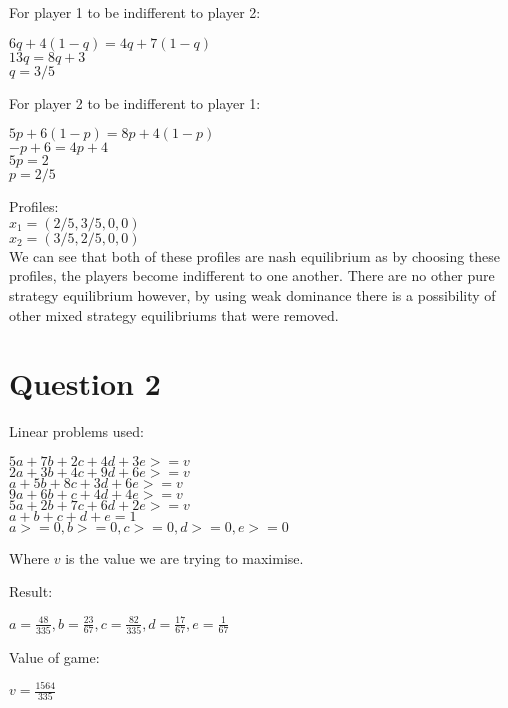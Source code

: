 \documentclass[11pt]{article}
\begin{document}
For player 1 to be indifferent to player 2:
\begin{center}
$6q + 4(1 - q) = 4q + 7(1 - q)$ \\
$13q = 8q + 3$\\
$q = 3/5$\\
\end{center}

For player 2 to be indifferent to player 1:
\begin{center}
$5p + 6(1 - p) = 8p + 4(1 - p)$\\
$-p + 6 = 4p + 4$\\
$5p = 2$\\
$p = 2 / 5$
\end{center}

Profiles:\\
	$x_{1} = (2/5, 3/5, 0, 0)$ \\
	$x_{2} = (3/5, 2/5, 0, 0)$ \\
	
We can see that both of these profiles are nash equilibrium as by choosing these profiles, the players become indifferent to one another. There are no other pure strategy equilibrium however, by using weak dominance there is a possibility of other mixed strategy equilibriums that were removed. 

\section{Question 2}

Linear problems used:
\begin{center}
$5a + 7b + 2c + 4d + 3e >= v$ \\
$2a + 3b + 4c + 9d + 6e >= v$ \\
$a + 5b + 8c + 3d + 6e >= v$ \\
$9a + 6b + c + 4d + 4e >= v$ \\
$5a + 2b + 7c + 6d + 2e >= v$ \\
$a + b + c + d + e = 1$ \\
$a >= 0, b>=0, c>=0, d>=0, e>=0$
\end{center}

Where $v$ is the value we are trying to maximise.

Result:\\
\begin{center}
$a = \frac{48}{335}, b = \frac{23}{67}, c=\frac{82}{335}, d = \frac{17}{67}, e = \frac{1}{67}$
\end{center}

Value of game: 
\begin{center}
$v = \frac{1564}{335}$
\end{center}
\end{document}
